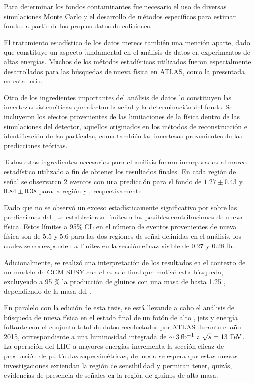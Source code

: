 Para determinar los fondos contaminantes fue necesario el uso de diversas
simulaciones Monte Carlo y el desarrollo de métodos específicos para estimar fondos a
partir de los propios datos de colisiones.

El tratamiento estadístico de los datos merece también una mención aparte, dado
que constituye un aspecto fundamental en el análisis de datos en experimentos de
altas energías. Muchos de los métodos estadísticos utilizados fueron
especialmente desarrollados para las búsquedas de nueva física en ATLAS, como la
presentada en esta tesis.

Otro de los ingredientes importantes del análisis de datos lo constituyen las
incertezas sistemáticas que afectan la señal y la determinación del fondo. Se
incluyeron los efectos provenientes de las limitaciones de la física dentro de
las simulaciones del detector, aquellos originados en los métodos de
reconstrucción e identificación de las partículas, como también las incertezas
provenientes de las predicciones teóricas.

Todos estos ingredientes necesarios para el análisis fueron incorporados al
marco estadístico utilizado a fin de obtener los resultados finales. En cada
región de señal se observaron 2 eventos con una predicción para el fondo de
$1.27\pm0.43$ y $0.84\pm 0.38$ para la región {\SRL} y {\SRH}, respectivamente.

Dado que no se observó un exceso estadísticamente significativo por sobre las predicciones del
{\SM}, se establecieron límites a las posibles contribuciones de nueva física.
Estos límites a 95\% CL en el número de eventos provenientes de nueva física son
de 5.5 y 5.6 para las dos regiones de señal definidas en el análisis, los cuales
se corresponden a límites en la sección eficaz visible de 0.27 y 0.28 fb.

Adicionalmente, se realizó una interpretación de los resultados en el contexto
de un modelo de GGM SUSY con el estado final que motivó esta búsqueda, excluyendo
a 95 \% {\cl} la producción de gluinos con una masa de hasta 1.25 \tev, dependiendo de la masa
del {\ninoone}.

En paralelo con la edición de esta tesis, se está llevando a cabo el análisis de
búsqueda de nueva física en el estado final de un fotón de alto {\pt}, jets y
energía faltante con el conjunto total de datos recolectados por ATLAS durante
el a\~no 2015, correspondiente a una luminosidad integrada de $\sim
\unit[3]{fb^{-1}}$ a $\sqrt{s}=13 \tev$. La operación del LHC a
mayores energías incrementa la sección eficaz de producción de partículas
supersimétricas, de modo se espera que estas nuevas investigaciones extiendan la región de
sensibilidad y permitan tener, quizás, evidencias de presencia de se\~nales en la
región de gluinos de alta masa.

